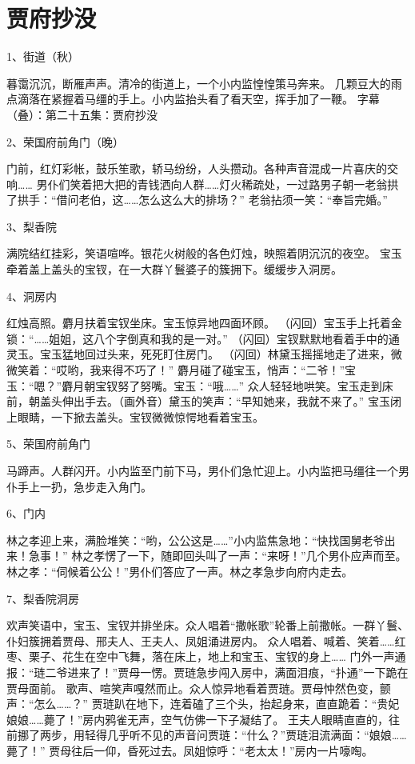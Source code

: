 \section*{贾府抄没}

1、街道（秋）\par
暮霭沉沉，断雁声声。清冷的街道上，一个小内监惶惶策马奔来。
几颗豆大的雨点滴落在紧握着马缰的手上。小内监抬头看了看天空，挥手加了一鞭。
字幕（叠）：第二十五集：贾府抄没

2、荣国府前角门（晚）\par
门前，红灯彩帐，鼓乐笙歌，轿马纷纷，人头攒动。各种声音混成一片喜庆的交响……
男仆们笑着把大把的青钱洒向人群……灯火稀疏处，一过路男子朝一老翁拱了拱手：“借问老伯，这……怎么这么大的排场？”
老翁拈须一笑：“奉旨完婚。”

3、梨香院\par
满院结红挂彩，笑语喧哗。银花火树般的各色灯烛，映照着阴沉沉的夜空。
宝玉牵着盖上盖头的宝钗，在一大群丫鬟婆子的簇拥下。缓缓步入洞房。

4、洞房内\par
红烛高照。麝月扶着宝钗坐床。宝玉惊异地四面环顾。
（闪回）宝玉手上托着金锁：“……姐姐，这八个字倒真和我的是一对。”
（闪回）宝钗默默地看着手中的通灵玉。宝玉猛地回过头来，死死盯住房门。
（闪回）林黛玉摇摇地走了进来，微微笑着：“哎哟，我来得不巧了！”
麝月碰了碰宝玉，悄声：“二爷！”宝玉：“嗯？”麝月朝宝钗努了努嘴。宝玉：“哦……”
众人轻轻地哄笑。宝玉走到床前，朝盖头伸出手去。（画外音）黛玉的笑声：“早知她来，我就不来了。”
宝玉闭上眼睛，一下掀去盖头。宝钗微微惊愕地看着宝玉。

5、荣国府前角门\par
马蹄声。人群闪开。小内监至门前下马，男仆们急忙迎上。小内监把马缰往一个男仆手上一扔，急步走入角门。

6、门内\par
林之孝迎上来，满脸堆笑：“哟，公公这是……”小内监焦急地：“快找国舅老爷出来！急事！”
林之孝愣了一下，随即回头叫了一声：“来呀！”几个男仆应声而至。林之孝：“伺候着公公！”男仆们答应了一声。林之孝急步向府内走去。

7、梨香院洞房\par
欢声笑语中，宝玉、宝钗并排坐床。众人唱着“撒帐歌”轮番上前撒帐。一群丫鬟、仆妇簇拥着贾母、邢夫人、王夫人、凤姐涌进房内。
众人唱着、喊着、笑着……红枣、栗子、花生在空中飞舞，落在床上，地上和宝玉、宝钗的身上……
门外一声通报：“琏二爷进来了！”贾母一愣。贾琏急步闯入房中，满面泪痕，“扑通”一下跪在贾母面前。
歌声、喧笑声嘎然而止。众人惊异地看着贾琏。贾母忡然色变，颤声：“怎么……？”
贾琏趴在地下，连着磕了三个头，抬起身来，直直跪着：“贵妃娘娘……薨了！”房内鸦雀无声，空气仿佛一下子凝结了。
王夫人眼睛直直的，往前挪了两步，用轻得几乎听不见的声音问贾琏：“什么？”贾琏泪流满面：“娘娘……薨了！”
贾母往后一仰，昏死过去。凤姐惊呼：“老太太！”房内一片嚎啕。

